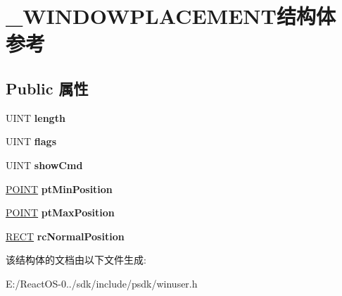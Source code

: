 \hypertarget{struct___w_i_n_d_o_w_p_l_a_c_e_m_e_n_t}{}\section{\+\_\+\+W\+I\+N\+D\+O\+W\+P\+L\+A\+C\+E\+M\+E\+N\+T结构体 参考}
\label{struct___w_i_n_d_o_w_p_l_a_c_e_m_e_n_t}
\subsection*{Public 属性}
\begin{DoxyCompactItemize}
\item 
\mbox{\label{struct___w_i_n_d_o_w_p_l_a_c_e_m_e_n_t_a03b9eee25eabef9c201219c173ccbfe9}} 
U\+I\+NT {\bfseries length}
\item 
\mbox{\label{struct___w_i_n_d_o_w_p_l_a_c_e_m_e_n_t_a6d11008599741c38736cf2f6599939b4}} 
U\+I\+NT {\bfseries flags}
\item 
\mbox{\label{struct___w_i_n_d_o_w_p_l_a_c_e_m_e_n_t_affd8566dd5b39a062ce1bf12bbf8ca7d}} 
U\+I\+NT {\bfseries show\+Cmd}
\item 
\mbox{\label{struct___w_i_n_d_o_w_p_l_a_c_e_m_e_n_t_aafe033ee1aafa0740bd2ba04e1b0cf9f}} 
\hyperlink{structtag_p_o_i_n_t}{P\+O\+I\+NT} {\bfseries pt\+Min\+Position}
\item 
\mbox{\label{struct___w_i_n_d_o_w_p_l_a_c_e_m_e_n_t_a75ebad2110e6d3565a8f63f4f39512d5}} 
\hyperlink{structtag_p_o_i_n_t}{P\+O\+I\+NT} {\bfseries pt\+Max\+Position}
\item 
\mbox{\label{struct___w_i_n_d_o_w_p_l_a_c_e_m_e_n_t_a7edfe129f4c06e76cb2f43c8ef49f26e}} 
\hyperlink{structtag_r_e_c_t}{R\+E\+CT} {\bfseries rc\+Normal\+Position}
\end{DoxyCompactItemize}


该结构体的文档由以下文件生成\+:\begin{DoxyCompactItemize}
\item 
E\+:/\+React\+O\+S-\/0../sdk/include/psdk/winuser.\+h\end{DoxyCompactItemize}
